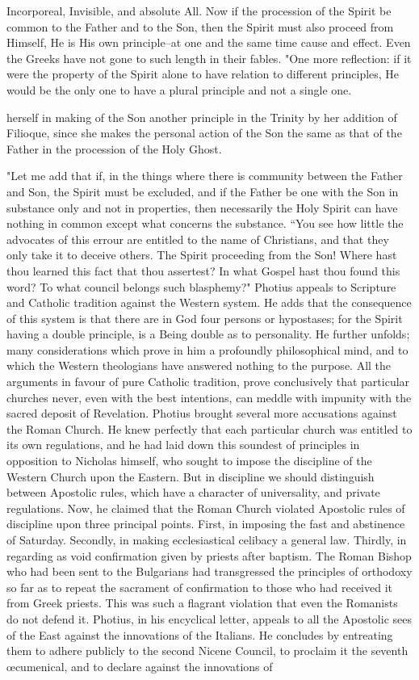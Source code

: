 Incorporeal, Invisible, and absolute All. Now if the procession of the Spirit be common to the Father and to the Son, then the Spirit must also proceed from Himself, He is His own principle--at one and the same time cause and effect. Even the Greeks have not gone to such length in their fables. "One more reflection: if it were the property of the Spirit alone to have relation to different principles, He would be the only one to have a plural principle and not a single one.

herself in making of the Son another principle in the Trinity by her addition of Filioque, since she makes the personal action of the Son the same as that of the Father in the procession of the Holy Ghost.

"Let me add that if, in the things where there is community between the Father and Son, the Spirit must be excluded, and if the Father be one with the Son in substance only and not in properties, then necessarily the Holy Spirit can have nothing in common except what concerns the substance. “You see how little the advocates of this errour are entitled to the name of Christians, and that they only take it to deceive others. The Spirit proceeding from the Son! Where hast thou learned this fact that thou assertest? In what Gospel hast thou found this word? To what council belongs such blasphemy?" Photius appeals to Scripture and Catholic tradition against the Western system. He adds that the consequence of this system is that there are in God four persons or hypostases; for the Spirit having a double principle, is a Being double as to personality. He further unfolds; many considerations which prove in him a profoundly philosophical mind, and to which the Western theologians have answered nothing to the purpose. All the arguments in favour of pure Catholic tradition, prove conclusively that particular churches never, even with the best intentions, can meddle with impunity with the sacred deposit of Revelation. Photius brought several more accusations against the Roman Church. He knew perfectly that each particular church was entitled to its own regulations, and he had laid down this soundest of principles in opposition to Nicholas himself, who sought to impose the discipline of the Western Church upon the Eastern. But in discipline we should distinguish between Apostolic rules, which have a character of universality, and private regulations. Now, he claimed that the Roman Church violated Apostolic rules of discipline upon three principal points. First, in imposing the fast and abstinence of Saturday. Secondly, in making ecclesiastical celibacy a general law. Thirdly, in regarding as void confirmation given by priests after baptism. The Roman Bishop who had been sent to the Bulgarians had transgressed the principles of orthodoxy so far as to repeat the sacrament of confirmation to those who had received it from Greek priests. This was such a flagrant violation that even the Romanists do not defend it. Photius, in his encyclical letter, appeals to all the Apostolic sees of the East against the innovations of the Italians. He concludes by entreating them to adhere publicly to the second Nicene Council, to proclaim it the seventh œcumenical, and to declare against the innovations of 